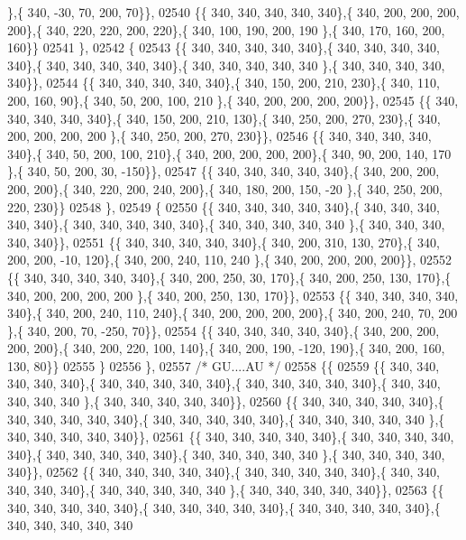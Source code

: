 \begin{DoxyCode}
      \},\{ 340, -30,  70, 200,  70\}\},
02540 \{\{ 340, 340, 340, 340, 340\},\{ 340, 200, 200, 200, 200\},\{ 340, 220, 220, 200, 220\},\{ 340, 100, 190, 200, 190
      \},\{ 340, 170, 160, 200, 160\}\}
02541 \},
02542 \{
02543 \{\{ 340, 340, 340, 340, 340\},\{ 340, 340, 340, 340, 340\},\{ 340, 340, 340, 340, 340\},\{ 340, 340, 340, 340, 340
      \},\{ 340, 340, 340, 340, 340\}\},
02544 \{\{ 340, 340, 340, 340, 340\},\{ 340, 150, 200, 210, 230\},\{ 340, 110, 200, 160,  90\},\{ 340,  50, 200, 100, 210
      \},\{ 340, 200, 200, 200, 200\}\},
02545 \{\{ 340, 340, 340, 340, 340\},\{ 340, 150, 200, 210, 130\},\{ 340, 250, 200, 270, 230\},\{ 340, 200, 200, 200, 200
      \},\{ 340, 250, 200, 270, 230\}\},
02546 \{\{ 340, 340, 340, 340, 340\},\{ 340,  50, 200, 100, 210\},\{ 340, 200, 200, 200, 200\},\{ 340,  90, 200, 140, 170
      \},\{ 340,  50, 200,  30, -150\}\},
02547 \{\{ 340, 340, 340, 340, 340\},\{ 340, 200, 200, 200, 200\},\{ 340, 220, 200, 240, 200\},\{ 340, 180, 200, 150, -20
      \},\{ 340, 250, 200, 220, 230\}\}
02548 \},
02549 \{
02550 \{\{ 340, 340, 340, 340, 340\},\{ 340, 340, 340, 340, 340\},\{ 340, 340, 340, 340, 340\},\{ 340, 340, 340, 340, 340
      \},\{ 340, 340, 340, 340, 340\}\},
02551 \{\{ 340, 340, 340, 340, 340\},\{ 340, 200, 310, 130, 270\},\{ 340, 200, 200, -10, 120\},\{ 340, 200, 240, 110, 240
      \},\{ 340, 200, 200, 200, 200\}\},
02552 \{\{ 340, 340, 340, 340, 340\},\{ 340, 200, 250,  30, 170\},\{ 340, 200, 250, 130, 170\},\{ 340, 200, 200, 200, 200
      \},\{ 340, 200, 250, 130, 170\}\},
02553 \{\{ 340, 340, 340, 340, 340\},\{ 340, 200, 240, 110, 240\},\{ 340, 200, 200, 200, 200\},\{ 340, 200, 240,  70, 200
      \},\{ 340, 200,  70, -250,  70\}\},
02554 \{\{ 340, 340, 340, 340, 340\},\{ 340, 200, 200, 200, 200\},\{ 340, 200, 220, 100, 140\},\{ 340, 200, 190, -120, 
      190\},\{ 340, 200, 160, 130,  80\}\}
02555 \}
02556 \},
02557 \textcolor{comment}{/* GU....AU */}
02558 \{\{
02559 \{\{ 340, 340, 340, 340, 340\},\{ 340, 340, 340, 340, 340\},\{ 340, 340, 340, 340, 340\},\{ 340, 340, 340, 340, 340
      \},\{ 340, 340, 340, 340, 340\}\},
02560 \{\{ 340, 340, 340, 340, 340\},\{ 340, 340, 340, 340, 340\},\{ 340, 340, 340, 340, 340\},\{ 340, 340, 340, 340, 340
      \},\{ 340, 340, 340, 340, 340\}\},
02561 \{\{ 340, 340, 340, 340, 340\},\{ 340, 340, 340, 340, 340\},\{ 340, 340, 340, 340, 340\},\{ 340, 340, 340, 340, 340
      \},\{ 340, 340, 340, 340, 340\}\},
02562 \{\{ 340, 340, 340, 340, 340\},\{ 340, 340, 340, 340, 340\},\{ 340, 340, 340, 340, 340\},\{ 340, 340, 340, 340, 340
      \},\{ 340, 340, 340, 340, 340\}\},
02563 \{\{ 340, 340, 340, 340, 340\},\{ 340, 340, 340, 340, 340\},\{ 340, 340, 340, 340, 340\},\{ 340, 340, 340, 340, 340

\end{DoxyCode}
